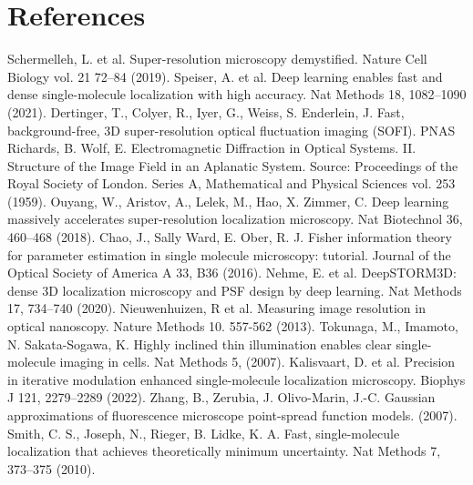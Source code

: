 \documentclass{ucetd}
\begin{document}
\section{References}

\noindent [1] Schermelleh, L. et al. Super-resolution microscopy demystified. Nature Cell Biology vol. 21 72–84 (2019). 
\newline
\noindent [2] Speiser, A. et al. Deep learning enables fast and dense single-molecule localization with high accuracy. Nat Methods 18, 1082–1090 (2021).
\newline
\noindent [3] Dertinger, T., Colyer, R., Iyer, G., Weiss, S. Enderlein, J. Fast, background-free, 3D super-resolution optical fluctuation imaging (SOFI). PNAS
\newline
\noindent [4] Richards, B. Wolf, E. Electromagnetic Diffraction in Optical Systems. II. Structure of the Image Field in an Aplanatic System. Source: Proceedings of the Royal Society of London. Series A, Mathematical and Physical Sciences vol. 253 (1959). 
\newline
\noindent [5] Ouyang, W., Aristov, A., Lelek, M., Hao, X. Zimmer, C. Deep learning massively accelerates super-resolution localization microscopy. Nat Biotechnol 36, 460–468 (2018). 
\newline
\noindent [6] Chao, J., Sally Ward, E. Ober, R. J. Fisher information theory for parameter estimation in single molecule microscopy: tutorial. Journal of the Optical Society of America A 33, B36 (2016). 
\newline
\noindent [7] Nehme, E. et al. DeepSTORM3D: dense 3D localization microscopy and PSF design by deep learning. Nat Methods 17, 734–740 (2020). 
\newline
\noindent [8] Nieuwenhuizen, R et al. Measuring image resolution in optical nanoscopy. Nature Methods 10. 557-562 (2013). 
\noindent [9] Tokunaga, M., Imamoto, N. Sakata-Sogawa, K. Highly inclined thin illumination enables clear single-molecule imaging in cells. Nat Methods 5, (2007). 
\newline
\noindent [10] Kalisvaart, D. et al. Precision in iterative modulation enhanced single-molecule localization microscopy. Biophys J 121, 2279–2289 (2022). 
\newline
\noindent [11] Zhang, B., Zerubia, J. Olivo-Marin, J.-C. Gaussian approximations of fluorescence microscope point-spread function models. (2007). 
\newline
\noindent [12] Smith, C. S., Joseph, N., Rieger, B. Lidke, K. A. Fast, single-molecule localization that achieves theoretically minimum uncertainty. Nat Methods 7, 373–375 (2010). 
\end{document}
